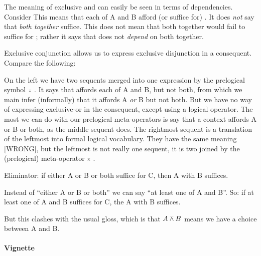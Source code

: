 \documentclass{article}
\begin{document}
The meaning of exclusive and can easily be seen in terms of
dependencies. Consider
This means that each of A and B afford (or suffice for)
\ContextD. It does \textit{not} say that \textit{both together}
suffice. This does not mean that both together would fail to suffice
for \ContextD; rather it says that \ContextD does not \textit{depend}
on both together.

Exclusive conjunction allows us to express exclusive disjunction in a
consequent. Compare the following:


On the left we have two sequents merged into one expression by the
prelogical symbol \(\scriptscriptstyle\barwedge\ \). It says that \ContextG affords each of
A and B, but not both, from which we main infer (informally) that it
affords A \textit{or} B but not both. But we have no way of expressing
exclusive-or in the consequent, except using a logical operator. The
most we can do with our prelogical meta-operators is say that a
context affords A or B or both, as the middle sequent does. The
rightmost sequent is a translation of the leftmost into formal logical
vocabulary. They have the same meaning [WRONG], but the leftmost is
not really one sequent, it is two joined by the (prelogical)
meta-operator \(\scriptscriptstyle\barwedge\ \).

Eliminator: if either A or B or both suffice for C, then A with B
suffices.

Instead of ``either A or B or both'' we can say ``at least one of A
and B''. So: if at least one of A and B suffices for C, the A with B
suffices.

But this clashes with the usual gloss, which is that \(A\barwedge B\) means we have a choice between A and B.

\paragraph{Vignette\\}
\end{document}
